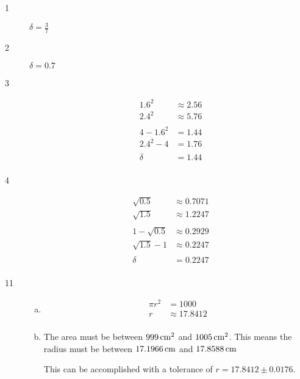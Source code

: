 \documentclass[letterpaper, landscape]{exam}
\begin{document}
    \begin{description}

      \item[1] $\delta = \boxed{ \frac{3}{7} }$

      \item[2] $\delta = \boxed{ 0.7 }$

      \item[3]
        \begin{align*}
          1.6^2     & \approx 2.56 \\
          2.4^2     & \approx 5.76 \\
          \\
          4 - 1.6^2 & = 1.44 \\
          2.4^2 - 4 & = 1.76 \\
          \\
          \delta    & = \boxed{ 1.44 } \\
        \end{align*}

      \item[4]
        \begin{align*}
          \sqrt{0.5}     & \approx 0.7071 \\
          \sqrt{1.5}     & \approx 1.2247 \\
          \\
          1 - \sqrt{0.5} & \approx 0.2929 \\
          \sqrt{1.5} - 1 & \approx 0.2247 \\
          \\
          \delta    & = \boxed{ 0.2247 } \\
        \end{align*}

      \item[11]
        \begin{enumerate}[(a)]
          \item 
            \begin{align*}
              \pi r^2 & = 1000 \\
              r       & \approx \boxed{ 17.8412 } \\
            \end{align*}

          \item The area must be between $\unit[999]{cm^2}$ and $\unit[1005]{cm^2}$. This
            means the radius must be between $\unit[17.1966]{cm}$ and $\unit[17.8588]{cm}$

            This can be accomplished with a tolerance of $r = 17.8412 \pm \boxed{ 0.0176 }$.


\end{enumerate}
\end{description}
\end{document}
